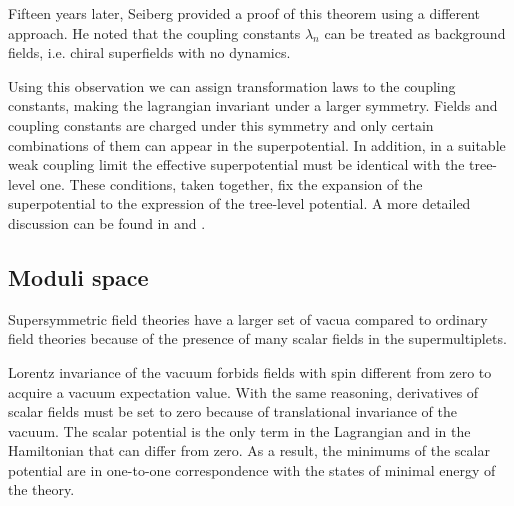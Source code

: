 Fifteen years later, Seiberg \cite{Seiberg:1993vc} provided a proof of this theorem using a different approach.
He noted that the coupling constants $\lambda_n$ can be treated as background fields, i.e. chiral superfields with no dynamics.

Using this observation we can assign transformation laws to the coupling constants, making the lagrangian invariant under a larger symmetry.
Fields and coupling constants are charged under this symmetry and only certain combinations of them can appear in the superpotential.
In addition, in a suitable weak coupling limit the effective superpotential must be identical with the tree-level one.
These conditions, taken together, fix the expansion of the superpotential to the expression of the tree-level potential.
A more detailed discussion can be found in \cite{Seiberg:1994bp} and \cite{Intriligator:1995au}.











\subsection{Moduli space}
Supersymmetric field theories have a larger set of vacua compared to ordinary field theories because of the presence of many scalar fields in the supermultiplets.

Lorentz invariance of the vacuum forbids fields with spin different from zero to acquire a vacuum expectation value.
With the same reasoning, derivatives of scalar fields must be set to zero because of translational invariance of the vacuum.
The scalar potential is the only term in the Lagrangian and in the Hamiltonian that can differ from zero.
As a result, the minimums of the scalar potential are in one-to-one correspondence with the states of minimal energy of the theory.



